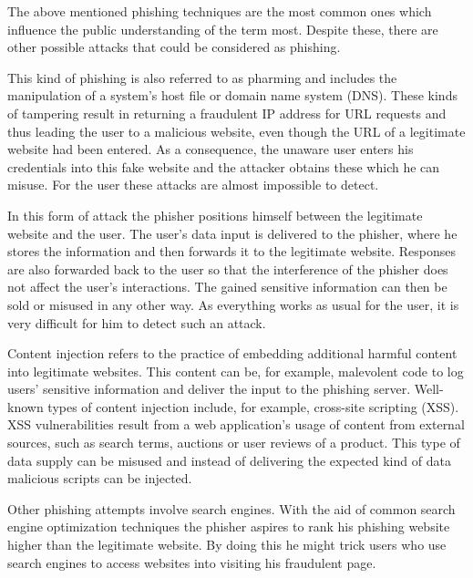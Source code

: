 The above mentioned phishing techniques are the most common ones which influence the public understanding of the term most.
Despite these, there are other possible attacks that could be considered as phishing.

\begin{description}[leftmargin=0cm]
	\item[DNS Hijacking] This kind of phishing is also referred to as pharming and includes the manipulation of a system's host file or domain name system (DNS).
 These kinds of tampering result in returning a fraudulent IP address for URL requests and thus leading the user to a malicious website, even though the URL of a legitimate website had been entered.
 As a consequence, the unaware user enters his credentials into this fake website and the attacker obtains these which he can misuse.
 For the user these attacks are almost impossible to detect.

	\item[Man-in-the-Middle Attack] In this form of attack the phisher positions himself between the legitimate website and the user.
 The user's data input is delivered to the phisher, where he stores the information and then forwards it to the legitimate website.
 Responses are also forwarded back to the user so that the interference of the phisher does not affect the user's interactions.
 The gained sensitive information can then be sold or misused in any other way.
 As everything works as usual for the user, it is very difficult for him to detect such an attack.
 
	\item[Content Injection/XSS] Content injection refers to the practice of embedding additional harmful content into legitimate websites.
 This content can be, for example, malevolent code to log users' sensitive information and deliver the input to the phishing server.
 Well-known types of content injection include, for example, cross-site scripting (XSS).
XSS vulnerabilities result from a web application's usage of content from external sources, such as search terms, auctions or user reviews of a product.
 This type of data supply can be misused and instead of delivering the expected kind of data malicious scripts can be injected.

	\item[Search Engine Poisoning] Other phishing attempts involve search engines.
	With the aid of common search engine optimization techniques the phisher aspires to rank his phishing website higher than the legitimate website. By doing this he might trick users who use search engines to access websites into visiting his fraudulent page.
	
\end{description}

